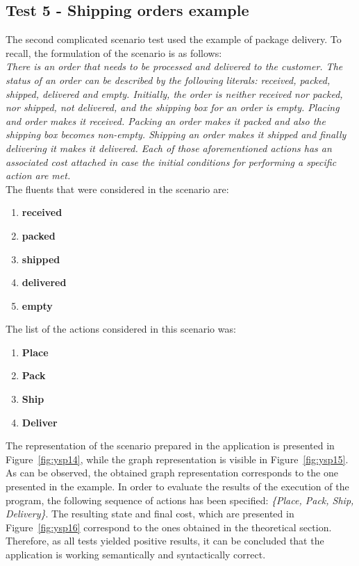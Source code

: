 \documentclass[a4paper]{article}
\begin{document}

\subsection{Test 5 - Shipping orders example}
%
The second complicated scenario test used the example of package delivery. To recall, the formulation of the scenario is as follows:
\\[0.5\baselineskip]
\textit{There is an order that needs to be processed and delivered to the customer. The status of an order can be described by the following literals: received, packed, shipped, delivered and empty. Initially, the order is neither received nor packed, nor shipped, not delivered, and the shipping box for an order is empty. Placing and order makes it received. Packing an order makes it packed and also the shipping box becomes non-empty. Shipping an order makes it shipped and finally delivering it makes it delivered. Each of those aforementioned actions has an associated cost attached in case the initial conditions for
performing a specific action are met.}
\\[0.5\baselineskip]
The fluents that were considered in the scenario are:
\begin{enumerate}
    \item \textbf{received}
    \item \textbf{packed}
    \item \textbf{shipped}
    \item \textbf{delivered}
    \item \textbf{empty}
\end{enumerate}
The list of the actions considered in this scenario was:
\begin{enumerate}
    \item \textbf{Place}
    \item \textbf{Pack}
    \item \textbf{Ship}
    \item \textbf{Deliver}
\end{enumerate}
The representation of the scenario prepared in the application is presented in Figure~\ref{fig:ysp14}, while the graph representation is visible in Figure~\ref{fig:ysp15}. As can be observed, the obtained graph representation corresponds to the one presented in the example. In order to evaluate the results of the execution of the program, the following sequence of actions has been specified: \textit{\{Place, Pack, Ship, Delivery\}}. The resulting state and final cost, which are presented in Figure~\ref{fig:ysp16} correspond to the ones obtained in the theoretical section. Therefore, as all tests yielded positive results, it can be concluded that the application is working semantically and syntactically correct.
\end{document}
